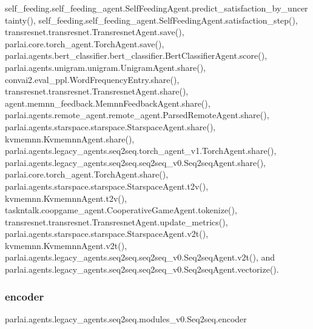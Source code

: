 self\+\_\+feeding.\+self\+\_\+feeding\+\_\+agent.\+Self\+Feeding\+Agent.\+predict\+\_\+satisfaction\+\_\+by\+\_\+uncertainty(), self\+\_\+feeding.\+self\+\_\+feeding\+\_\+agent.\+Self\+Feeding\+Agent.\+satisfaction\+\_\+step(), transresnet.\+transresnet.\+Transresnet\+Agent.\+save(), parlai.\+core.\+torch\+\_\+agent.\+Torch\+Agent.\+save(), parlai.\+agents.\+bert\+\_\+classifier.\+bert\+\_\+classifier.\+Bert\+Classifier\+Agent.\+score(), parlai.\+agents.\+unigram.\+unigram.\+Unigram\+Agent.\+share(), convai2.\+eval\+\_\+ppl.\+Word\+Frequency\+Entry.\+share(), transresnet.\+transresnet.\+Transresnet\+Agent.\+share(), agent.\+memnn\+\_\+feedback.\+Memnn\+Feedback\+Agent.\+share(), parlai.\+agents.\+remote\+\_\+agent.\+remote\+\_\+agent.\+Parsed\+Remote\+Agent.\+share(), parlai.\+agents.\+starspace.\+starspace.\+Starspace\+Agent.\+share(), kvmemnn.\+Kvmemnn\+Agent.\+share(), parlai.\+agents.\+legacy\+\_\+agents.\+seq2seq.\+torch\+\_\+agent\+\_\+v1.\+Torch\+Agent.\+share(), parlai.\+agents.\+legacy\+\_\+agents.\+seq2seq.\+seq2seq\+\_\+v0.\+Seq2seq\+Agent.\+share(), parlai.\+core.\+torch\+\_\+agent.\+Torch\+Agent.\+share(), parlai.\+agents.\+starspace.\+starspace.\+Starspace\+Agent.\+t2v(), kvmemnn.\+Kvmemnn\+Agent.\+t2v(), taskntalk.\+coopgame\+\_\+agent.\+Cooperative\+Game\+Agent.\+tokenize(), transresnet.\+transresnet.\+Transresnet\+Agent.\+update\+\_\+metrics(), parlai.\+agents.\+starspace.\+starspace.\+Starspace\+Agent.\+v2t(), kvmemnn.\+Kvmemnn\+Agent.\+v2t(), parlai.\+agents.\+legacy\+\_\+agents.\+seq2seq.\+seq2seq\+\_\+v0.\+Seq2seq\+Agent.\+v2t(), and parlai.\+agents.\+legacy\+\_\+agents.\+seq2seq.\+seq2seq\+\_\+v0.\+Seq2seq\+Agent.\+vectorize().

\mbox{\label{classparlai_1_1agents_1_1legacy__agents_1_1seq2seq_1_1modules__v0_1_1Seq2seq_af2bad7e6370b6bb7ef5c297a2826c9c5}} 
\subsubsection{\texorpdfstring{encoder}{encoder}}
{\footnotesize\ttfamily parlai.\+agents.\+legacy\+\_\+agents.\+seq2seq.\+modules\+\_\+v0.\+Seq2seq.\+encoder}



